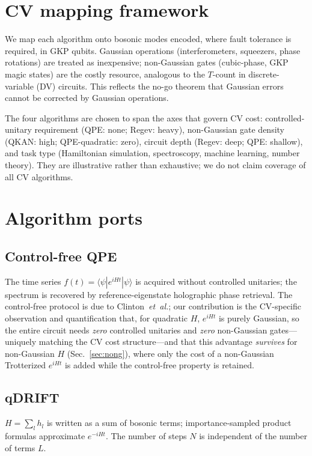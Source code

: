 \documentclass[aps,prxquantum,reprint,superscriptaddress,nofootinbib]{revtex4-2}
\begin{document}
\section{CV mapping framework}
We map each algorithm onto bosonic modes encoded, where fault tolerance is
required, in GKP qubits. Gaussian operations (interferometers, squeezers,
phase rotations) are treated as inexpensive; non-Gaussian gates
(cubic-phase, GKP magic states) are the costly resource, analogous to the
$T$-count in discrete-variable (DV) circuits. This reflects the
no-go theorem that Gaussian errors cannot be corrected by Gaussian
operations.

The four algorithms are chosen to span the axes that govern CV cost:
controlled-unitary requirement (QPE: none; Regev: heavy), non-Gaussian gate
density (QKAN: high; QPE-quadratic: zero), circuit depth (Regev: deep; QPE:
shallow), and task type (Hamiltonian simulation, spectroscopy, machine
learning, number theory). They are illustrative rather than exhaustive; we do
not claim coverage of all CV algorithms.

\section{Algorithm ports}
\subsection{Control-free QPE}
The time series $f(t)=\langle\psi|e^{iHt}|\psi\rangle$ is acquired without
controlled unitaries; the spectrum is recovered by reference-eigenstate
holographic phase retrieval. The control-free protocol is due to
Clinton~\emph{et~al.}; our contribution is the CV-specific observation and
quantification that, for quadratic $H$, $e^{iHt}$ is purely Gaussian, so the
entire circuit needs \emph{zero} controlled unitaries and \emph{zero}
non-Gaussian gates---uniquely matching the CV cost structure---and that this
advantage \emph{survives} for non-Gaussian $H$ (Sec.~\ref{sec:nong}), where
only the cost of a non-Gaussian Trotterized $e^{iHt}$ is added while the
control-free property is retained.

\subsection{qDRIFT}
$H=\sum_l h_l$ is written as a sum of bosonic terms; importance-sampled
product formulas approximate $e^{-iHt}$. The number of steps $N$ is
independent of the number of terms $L$.
\end{document}
